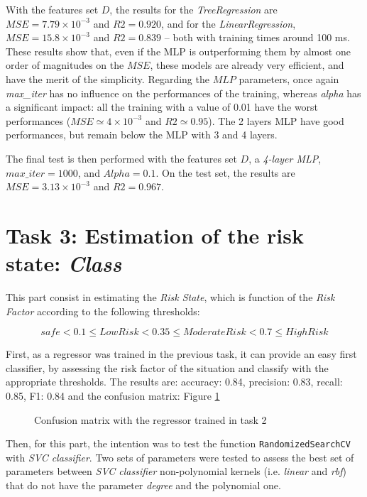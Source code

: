 \documentclass[11pt]{article}
\def\rf{\emph{Risk Factor }}
\begin{document}
    With the features set $D$, the results for the \emph{TreeRegression} are $MSE=7.79 \times 10^{-3}$ and $R2=0.920$, and for the \emph{LinearRegression}, $MSE=15.8 \times 10^{-3}$ and $R2=0.839$ -- both with training times around 100 ms. These results show that, even if the MLP is outperforming them by almost one order of magnitudes on the $MSE$, these models are already very efficient, and have the merit of the simplicity. Regarding the $MLP$ parameters, once again \emph{max\_iter} has no influence on the performances of the training, whereas \emph{alpha} has a significant impact: all the training with a value of 0.01 have the worst performances ($MSE\simeq 4 \times 10^{-3}$ and $R2\simeq 0.95$). The 2 layers MLP have good performances, but remain below the MLP with 3 and 4 layers.

    The final test is then performed with the features set $D$, a \emph{4-layer MLP}, $max\_iter=1000$, and $Alpha=0.1$. On the test set, the results are $MSE=3.13 \times 10^{-3}$ and $R2=0.967$.

\pagebreak

\section{Task 3: Estimation of the risk state: \emph{Class}}
This part consist in estimating the \emph{Risk State}, which is function of the \rf according to the following thresholds:

$$ safe  < 0.1 \leq LowRisk < 0.35 \leq ModerateRisk < 0.7 \leq HighRisk $$

First, as a regressor was trained in the previous task, it can provide an easy first classifier, by assessing the risk factor of the situation and classify with the appropriate thresholds. The results are: accuracy: 0.84, precision: 0.83, recall: 0.85, F1: 0.84 and the confusion matrix: Figure \ref{fig:CM_rg}

\begin{figure}{}
    \centering
    
    \caption{\label{fig:CM_rg}Confusion matrix with the regressor trained in task 2}
\end{figure}

Then, for this part, the intention was to test the function \texttt{RandomizedSearchCV} with \emph{SVC classifier}. Two sets of parameters were tested to assess the best set of parameters between \emph{SVC classifier} non-polynomial kernels (i.e. \emph{linear} and \emph{rbf}) that do not have the parameter \emph{degree} and the polynomial one.
\end{document}
